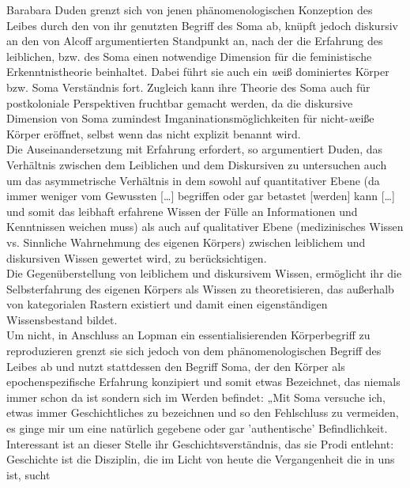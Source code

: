 Barabara Duden grenzt sich von jenen phänomenologischen Konzeption des Leibes
durch den von ihr genutzten Begriff des Soma ab, knüpft jedoch diskursiv an den
von Alcoff argumentierten Standpunkt an, nach der die Erfahrung des leiblichen,
bzw. des Soma einen notwendige Dimension für die feministische
Erkenntnistheorie beinhaltet. Dabei führt sie auch ein \textit{w}eiß dominiertes Körper
bzw. Soma Verständnis fort. Zugleich kann ihre Theorie des Soma auch für
postkoloniale Perspektiven fruchtbar gemacht werden, da die diskursive
Dimension von Soma zumindest Imganinationsmöglichkeiten für nicht-\textit{w}eiße Körper
eröffnet, selbst wenn das nicht explizit benannt wird.\\

\noindent Die Auseinandersetzung mit Erfahrung erfordert, so argumentiert Duden, das
Verhältnis zwischen dem Leiblichen und dem Diskursiven zu untersuchen auch um
das asymmetrische Verhältnis in dem sowohl auf quantitativer Ebene (\glqq da immer
weniger vom Gewussten […] begriffen oder gar betastet [werden] kann […] und
somit das leibhaft erfahrene Wissen der Fülle an Informationen und Kenntnissen
weichen muss\grqq)\footnotemark {} als auch auf qualitativer Ebene (medizinisches Wissen vs.
Sinnliche Wahrnehmung des eigenen Körpers) zwischen leiblichem und diskursiven
Wissen gewertet wird, zu berücksichtigen.\\

\noindent Die Gegenüberstellung von leiblichem und diskursivem Wissen, ermöglicht ihr die
Selbsterfahrung des eigenen Körpers als Wissen zu theoretisieren, das außerhalb
von kategorialen Rastern existiert und damit einen eigenständigen
Wissensbestand bildet. \\
Um nicht, in Anschluss an Lopman ein essentialisierenden
Körperbegriff zu reproduzieren grenzt sie sich jedoch von dem
phänomenologischen Begriff des Leibes ab und nutzt stattdessen den Begriff
Soma, der den Körper als \glqq epochenspezifische Erfahrung\grqq \footnotemark
{} konzipiert und somit
etwas Bezeichnet, das niemals immer schon da ist sondern sich im Werden
befindet: „Mit Soma versuche ich, etwas immer Geschichtliches zu bezeichnen und
so den Fehlschluss zu vermeiden, es ginge mir um eine natürlich gegebene oder
gar 'authentische' Befindlichkeit. Interessant ist an dieser Stelle ihr
Geschichtsverständnis, das sie Prodi entlehnt: \glqq [...] Geschichte ist die
Disziplin, die im Licht von heute die Vergangenheit die in uns ist, sucht\grqq
\footnotemark {}\\

